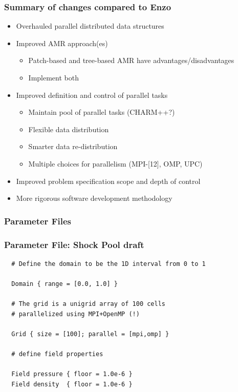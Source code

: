\documentclass{beamer}
\newcommand{\enzo}{\textsf{Enzo}}
\begin{document}
\begin{frame}
\frametitle{Summary of changes compared to \enzo}
\begin{itemize}
\item Overhauled parallel distributed data structures
\item Improved AMR approach(es)
\begin{itemize}
\item  Patch-based and tree-based AMR have advantages/disadvantages
\item  Implement both
\end{itemize}
\item Improved definition and control of parallel tasks
\begin{itemize}
\item Maintain pool of parallel tasks (CHARM++?)
\item Flexible data distribution
\item Smarter  data re-distribution
\item Multiple choices for parallelism (MPI-[12], OMP, UPC)
\end{itemize}
\item Improved problem specification scope and depth of control
\item More rigorous software development methodology
\end{itemize}
\end{frame}
    \begin{frame}[fragile] \frametitle{Parameter Files}
\end{frame}

    \begin{frame}[fragile] \frametitle{Parameter File: Shock Pool draft}
 \footnotesize
      \begin{verbatim}
  # Define the domain to be the 1D interval from 0 to 1

  Domain { range = [0.0, 1.0] }

  # The grid is a unigrid array of 100 cells 
  # parallelized using MPI+OpenMP (!)
 
  Grid { size = [100]; parallel = [mpi,omp] }

  # define field properties

  Field pressure { floor = 1.0e-6 }
  Field density  { floor = 1.0e-6 }
      \end{verbatim}
\end{frame}
\end{document}
